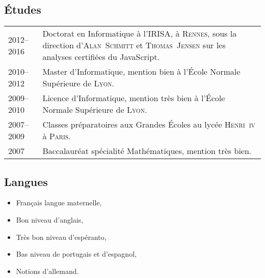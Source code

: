 \documentclass[12pt,a4paper]{article}
\makeatletter
\newenvironment{datecvsection}[1]%
               {\subsection*{#1}%
                 \noindent \begin{tabular}{@{}p{\annee}p{\texte}@{}}}
               {\end{tabular}}
\newenvironment{itemcvsection}[1]%
               {\subsection*{#1}\begin{itemize}}
               {\end{itemize}}
\makeatother
\begin{document}
\begin{datecvsection}{Études}

    2012–2016 & Doctorat en Informatique à l’\textsc{IRISA}, à \textsc{Rennes}, sous la direction d’\textsc{Alan~Schmitt} et \textsc{Thomas~Jensen} sur les analyses certifiées du JavaScript. \\

	2010–2012 & Master d’Informatique, mention bien à l’École Normale Supérieure de \textsc{Lyon}. \\

	2009–2010 & Licence d’Informatique, mention très bien à l’École Normale Supérieure de \textsc{Lyon}. \\

	2007–2009 & Classes préparatoires aux Grandes Écoles au lycée \textsc{Henri~iv} à \textsc{Paris}. \\

	2007 & Baccalauréat spécialité Mathématiques, mention très bien. \\

\end{datecvsection}

\begin{itemcvsection}{Langues}

   \item Français langue maternelle,
   \item Bon niveau d’anglais,
   \item Très bon niveau d’espéranto,
   \item Bas niveau de portugais et d’espagnol,
   \item Notions d’allemand.

\end{itemcvsection}
\end{document}
